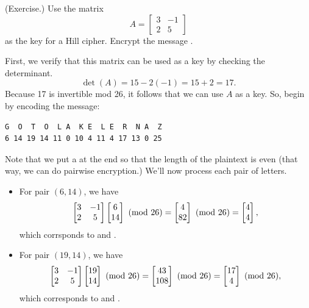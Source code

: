 \documentclass[letterpaper]{article}
\newcommand{\0}{\mathbf{0}}
\begin{document}
\begin{mdframed}
    (Exercise.) Use the matrix \[A = \begin{bmatrix}
        3 & -1 \\ 2 & 5
    \end{bmatrix}\] as the key for a Hill cipher. Encrypt the message .

    \begin{mdframed}
        First, we verify that this matrix can be used as a key by checking the determinant.
        \[\det(A) = 15 - 2(-1) = 15 + 2 = 17.\]
        Because 17 is invertible mod 26, it follows that we can use $A$ as a key. So, begin by encoding the message: 
        \begin{mdframed}
            \begin{verbatim}
G  O  T  O  L A  K E  L E  R  N A  Z
6 14 19 14 11 0 10 4 11 4 17 13 0 25\end{verbatim}
        \end{mdframed}
        Note that we put a  at the end so that the length of the plaintext is even (that way, we can do pairwise encryption.) We'll now process each pair of letters. 
        \begin{itemize}
            \item For pair $(6, 14)$, we have 
            \[\begin{bmatrix}
                3 & -1 \\ 2 & 5
            \end{bmatrix} \begin{bmatrix}
                6 \\ 14
            \end{bmatrix} \ (\mathrm{mod}\ 26) = \begin{bmatrix}
                4 \\ 82 
            \end{bmatrix} \ (\mathrm{mod}\ 26) = \begin{bmatrix}
                4 \\ 4
            \end{bmatrix},\]
            which corrsponds to  and .

            \item For pair $(19, 14)$, we have 
            \[\begin{bmatrix}
                3 & -1 \\ 2 & 5
            \end{bmatrix} \begin{bmatrix}
                19 \\ 14
            \end{bmatrix} \ (\mathrm{mod}\ 26) = \begin{bmatrix}
                43 \\ 108
            \end{bmatrix} \ (\mathrm{mod}\ 26) = \begin{bmatrix}
                17 \\ 4
            \end{bmatrix} \ (\mathrm{mod}\ 26),\]
            which corresponds to  and .


\end{itemize}
\end{mdframed}
\end{mdframed}
\end{document}
